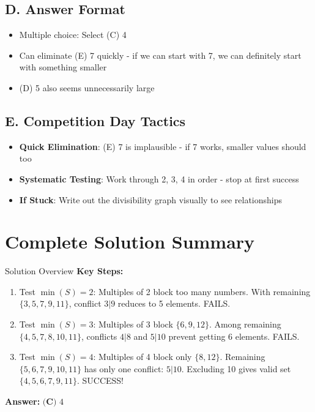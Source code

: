 \documentclass[12pt]{article}
\begin{document}
\begin{competitionbox}
\subsection*{D. Answer Format}
\begin{itemize}[leftmargin=*]
    \item Multiple choice: Select (C) 4
    \item Can eliminate (E) 7 quickly - if we can start with 7, we can definitely start with something smaller
    \item (D) 5 also seems unnecessarily large
\end{itemize}

\subsection*{E. Competition Day Tactics}
\begin{itemize}[leftmargin=*]
    \item \textbf{Quick Elimination}: (E) 7 is implausible - if 7 works, smaller values should too
    \item \textbf{Systematic Testing}: Work through 2, 3, 4 in order - stop at first success
    \item \textbf{If Stuck}: Write out the divisibility graph visually to see relationships
\end{itemize}
\end{competitionbox}

\newpage

\section*{Complete Solution Summary}

\begin{highlightbox}{Solution Overview}
\textbf{Key Steps:}
\begin{enumerate}
    \item Test $\min(S) = 2$: Multiples of 2 block too many numbers. With remaining $\{3,5,7,9,11\}$, conflict $3|9$ reduces to 5 elements. FAILS.
    
    \item Test $\min(S) = 3$: Multiples of 3 block $\{6,9,12\}$. Among remaining $\{4,5,7,8,10,11\}$, conflicts $4|8$ and $5|10$ prevent getting 6 elements. FAILS.
    
    \item Test $\min(S) = 4$: Multiples of 4 block only $\{8,12\}$. Remaining $\{5,6,7,9,10,11\}$ has only one conflict: $5|10$. Excluding 10 gives valid set $\{4,5,6,7,9,11\}$. SUCCESS!
\end{enumerate}

\textbf{Answer:} $\boxed{\textbf{(C) } 4}$
\end{highlightbox}
\end{document}
